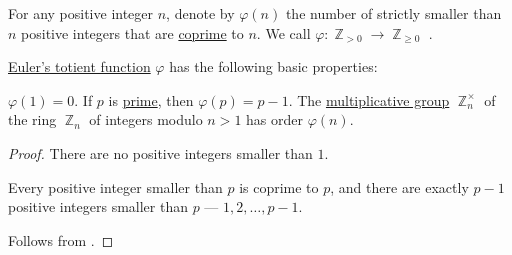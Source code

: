 \begin{definition}\label{def:eulers_totient_function}
  For any positive integer \( n \), denote by \( \varphi(n) \) the number of strictly smaller than \( n \) positive integers that are \hyperref[def:coprime_elements]{coprime} to \( n \). We call \( \varphi: \BbbZ_{>0} \to \BbbZ_{\geq 0} \) .
\end{definition}

\begin{proposition}\label{thm:def:eulers_totient_function}
  \hyperref[def:eulers_totient_function]{Euler's totient function} \( \varphi \) has the following basic properties:
  \begin{thmenum}
     \( \varphi(1) = 0 \).
     If \( p \) is \hyperref[def:prime_number]{prime}, then \( \varphi(p) = p - 1 \).
     The \hyperref[def:semiring]{multiplicative group} \( \BbbZ_n^\times \) of the ring \hyperref[thm:ring_of_integers_modulo]{\( \BbbZ_n \)} of integers modulo \( n > 1 \) has order \( \varphi(n) \).
  \end{thmenum}
\end{proposition}
\begin{proof}
   There are no positive integers smaller than \( 1 \).

   Every positive integer smaller than \( p \) is coprime to \( p \), and there are exactly \( p - 1 \) positive integers smaller than \( p \) --- \( 1, 2, \ldots, p - 1 \).

   Follows from .
\end{proof}

